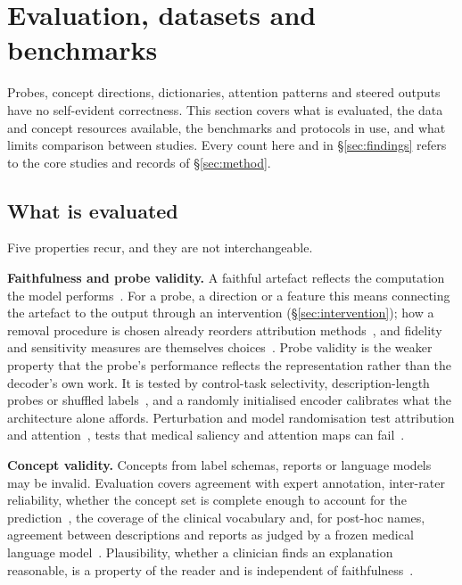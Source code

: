 \section{Evaluation, datasets and benchmarks}
\label{sec:evaluation}

Probes, concept directions, dictionaries, attention patterns and steered outputs have no self-evident
correctness. This section covers what is evaluated, the data and concept resources available, the
benchmarks and protocols in use, and what limits comparison between studies. Every count here and in
\S\ref{sec:findings} refers to the \Ncore{} core studies and \Nclaims{} records of \S\ref{sec:method}.

\subsection{What is evaluated}
\label{sec:eval-what}

Five properties recur, and they are not interchangeable.

\textbf{Faithfulness and probe validity.} A faithful artefact reflects the computation the model
performs~\cite{jacovi2020towards}. For a probe, a direction or a feature this means connecting the
artefact to the output through an intervention (\S\ref{sec:intervention}); how a removal procedure is
chosen already reorders attribution methods~\cite{hooker2019benchmark}, and fidelity and sensitivity
measures are themselves choices~\cite{yeh2019fidelity}. Probe validity is the weaker property that the
probe's performance reflects the representation rather than the decoder's own work. It is tested by
control-task selectivity, description-length probes or shuffled
labels~\cite{hewitt2019designing,voita2020information}, and a randomly initialised encoder calibrates what
the architecture alone affords. Perturbation and model randomisation test attribution and
attention~\cite{adebayo2018sanity}, tests that medical saliency and attention maps can
fail~\cite{arun2021trustworthiness,sadanandan2026attention}.

\textbf{Concept validity.} Concepts from label schemas, reports or language models may be invalid.
Evaluation covers agreement with expert annotation, inter-rater reliability, whether the concept set is
complete enough to account for the prediction~\cite{yeh2019completeness}, the coverage of the clinical
vocabulary and, for post-hoc names, agreement between descriptions and reports as judged by a frozen
medical language model~\cite{haque2026medconcept}. Plausibility, whether a clinician finds an
explanation reasonable, is a property of the reader and is independent of
faithfulness~\cite{jacovi2020towards,miller2017explanation}.

